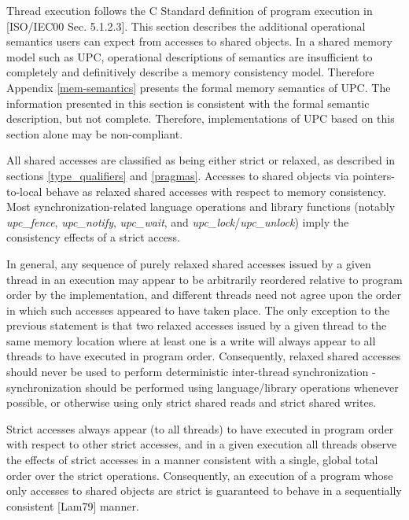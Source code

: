 \npf Thread execution follows the C Standard definition of
  program execution in [ISO/IEC00 Sec. 5.1.2.3].  This section describes
  the additional operational semantics users can expect from accesses to shared
  objects.  In a shared memory model such as UPC, operational
  descriptions of semantics are insufficient to completely
  and definitively describe a memory consistency model.  Therefore
  Appendix \ref{mem-semantics} presents the formal memory
  semantics of UPC.  The information presented in this section is consistent with
  the formal semantic description, but not complete.  Therefore, implementations
  of UPC based on this section alone may be non-compliant.
  
\np All shared accesses are classified as being either strict or relaxed,
  as described in sections \ref{type_qualifiers} and \ref{pragmas}.
  Accesses to shared objects via
  pointers-to-local behave as relaxed shared accesses with respect to memory
  consistency. Most synchronization-related language operations and library
  functions (notably {\it upc\_fence}, {\it upc\_notify}, {\it upc\_wait}, and
  {\it upc\_lock}/{\it upc\_unlock}) imply the consistency effects of a strict
  access.

\np In general, any sequence of purely relaxed shared accesses
  issued by a given
  thread in an execution may appear to be arbitrarily reordered relative to
  program order by the implementation, and different threads need not agree upon
  the order in which such accesses appeared to have taken place. The only
  exception to the previous statement is that two relaxed accesses issued by a
  given thread to the same memory location where at least one is a write will
  always appear to all threads to have executed in program order. Consequently,
  relaxed shared accesses should never be used to perform deterministic
  inter-thread synchronization - synchronization should be performed using
  language/library operations whenever possible, or otherwise using only strict
  shared reads and strict shared writes.

\np Strict accesses always appear (to all threads) to have executed
  in program
  order with respect to other strict accesses, and in a given execution all
  threads observe the effects of strict accesses in a manner consistent with a
  single, global total order over the strict operations. Consequently, an
  execution of a program whose only accesses to shared objects are strict 
  is guaranteed to behave in a sequentially consistent [Lam79] manner.

